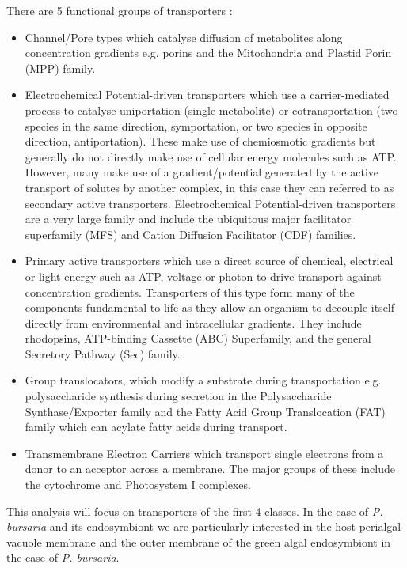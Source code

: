There are 5 functional groups of transporters \citep{Saier2014}:
\begin{itemize}
    \item Channel/Pore types which catalyse diffusion of metabolites along concentration
        gradients e.g. porins and the Mitochondria and Plastid Porin (MPP) family.
    \item Electrochemical Potential-driven transporters which use a carrier-mediated process to catalyse
        uniportation (single metabolite) or cotransportation (two species in the same
        direction, symportation, or two species in opposite direction, antiportation).  These make use
        of chemiosmotic gradients but generally do not directly make use of cellular energy molecules
        such as ATP. However, many make use of a gradient/potential generated by the active transport
        of solutes by another complex, in this case they can referred to as secondary active transporters.
        Electrochemical Potential-driven transporters are a very large family and include 
        the ubiquitous major facilitator superfamily (MFS) and Cation Diffusion Facilitator (CDF) families. 
    \item Primary active transporters which use a direct source of chemical, electrical or light energy 
        such as ATP, voltage or photon to drive transport against concentration gradients.  Transporters
         of this type form many of the components fundamental to life as they allow an organism to 
         decouple itself directly from environmental and intracellular gradients. 
         They include rhodopsins, ATP-binding Cassette (ABC) Superfamily, and the general Secretory Pathway (Sec)
        family.
    \item Group translocators, which modify a substrate during transportation e.g. polysaccharide synthesis
        during secretion in the Polysaccharide Synthase/Exporter family and the Fatty Acid Group Translocation (FAT)
        family which can acylate fatty acids during transport.
    \item Transmembrane Electron Carriers which transport single electrons from a donor to an acceptor across
        a membrane. The major groups of these include the cytochrome and Photosystem I complexes. 
\end{itemize}

This analysis will focus on transporters of the first 4 classes.
In the case of \textit{P. bursaria} and its endosymbiont we are
particularly interested in 
the host perialgal vacuole membrane and the outer membrane of the green
algal endosymbiont in the case of \textit{P. bursaria}.  

